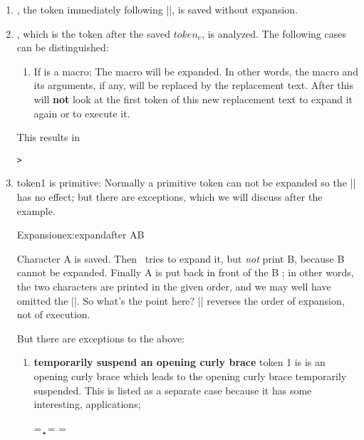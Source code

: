 \begin{enumerate}
\item  {}, the token immediately following |\expandafter|, is saved without expansion.
\item {}, which is the token after the saved $token_e$, is analyzed. The following cases can be distinguished:
\begin{enumerate}
\item If is a macro: The macro will be expanded. In other words, the macro and its arguments, if any, will be replaced by the replacement text. After this \tex will \textbf{not} look at the first token of this new replacement text to expand it again or to execute it.
\end{enumerate}



\begin{teX}
\def\xx [#1]{[#1]}
\def\yy{[ABC]}

\expandafter\xx\yy
\end{teX}

This results in 
\def\xx [#1]{[#1]}
\def\yy{[ABC]}

\texttt{> \expandafter\xx\yy}


\item token1 is primitive: Normally a primitive token can not be expanded so the |\expandafter| has no effect; but there are exceptions, which we will discuss after the example.

\begin{texexample}{Expansion}{ex:expandafter}
\expandafter AB
\end{texexample}

Character A is saved. Then \tex\ tries to expand it, but \textit{not} print B, because B cannot be expanded. Finally A is put back in front of the B ; in other words, the two characters are printed in the given order, and we may well have omitted the |\expandafter|. So what's the point here? |\expandafter| reverses the order of expansion, not of execution.

\noindent But there are exceptions to the above:
\begin{enumerate}
\item \textbf{temporarily suspend an opening curly brace} token 1 is is an opening curly brace which leads to the opening curly brace temporarily suspended. This is listed as a separate case because it has some interesting, applications;

\begin{teX}
\newtoks\ta
\newtoks\tb
\ta = {\a\b\c}
\tb=\expandafter{\the\ta}
\tb={\the\ta}
\tb
\end{teX}


\end{enumerate}
\end{enumerate}
